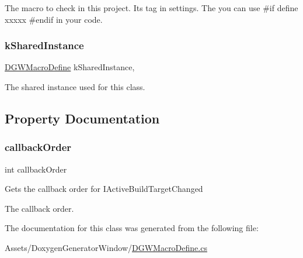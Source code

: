 The macro to check in this project. It\textquotesingle{}s tag in settings. The you can use \#if define xxxxx \#endif in your code. 

\mbox{\label{classDoxygenGeneratorWindow_1_1DGWMacroDefine_a0cb135a82751baf9f7f44bfb9f70db77}} 
\subsubsection{\texorpdfstring{k\+Shared\+Instance}{kSharedInstance}}
{\footnotesize\ttfamily \hyperlink{classDoxygenGeneratorWindow_1_1DGWMacroDefine_a6cb0c63ccea4107b1946288c5f69a96f}{D\+G\+W\+Macro\+Define} k\+Shared\+Instance\hspace{0.3cm}{\ttfamily [static]}, {\ttfamily [private]}}



The shared instance used for this class. 



\subsection{Property Documentation}
\mbox{\label{classDoxygenGeneratorWindow_1_1DGWMacroDefine_a365dacd9a6045034e8d550713003e2af}} 
\subsubsection{\texorpdfstring{callback\+Order}{callbackOrder}}
{\footnotesize\ttfamily int callback\+Order\hspace{0.3cm}{\ttfamily [get]}}



Gets the callback order for I\+Active\+Build\+Target\+Changed 

The callback order.

The documentation for this class was generated from the following file\+:\begin{DoxyCompactItemize}
\item 
Assets/\+Doxygen\+Generator\+Window/\hyperlink{DGWMacroDefine_8cs}{D\+G\+W\+Macro\+Define.\+cs}\end{DoxyCompactItemize}
